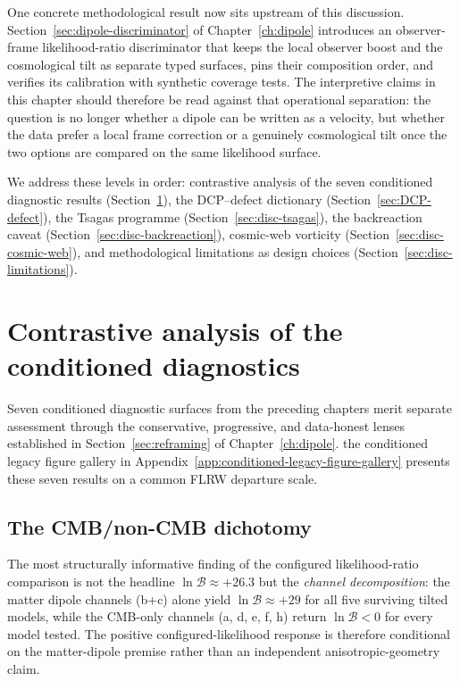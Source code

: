 One concrete methodological result now sits upstream of this
discussion.  Section~\ref{sec:dipole-discriminator} of
Chapter~\ref{ch:dipole} introduces an observer-frame
likelihood-ratio discriminator that keeps the local observer
boost and the cosmological tilt as separate typed surfaces, pins
their composition order, and verifies its calibration with
synthetic coverage tests.  The interpretive claims in this
chapter should therefore be read against that operational
separation: the question is no longer whether a dipole can be
written as a velocity, but whether the data prefer a local frame
correction or a genuinely cosmological tilt once the two options
are compared on the same likelihood surface.

We address these levels in order: contrastive analysis of the
seven conditioned diagnostic results
(Section~\ref{sec:contrastive}), the DCP--defect dictionary
(Section~\ref{sec:DCP-defect}), the Tsagas programme
(Section~\ref{sec:disc-tsagas}), the backreaction caveat
(Section~\ref{sec:disc-backreaction}), cosmic-web vorticity
(Section~\ref{sec:disc-cosmic-web}), and methodological
limitations as design choices
(Section~\ref{sec:disc-limitations}).


\section{Contrastive analysis of the conditioned diagnostics}
\label{sec:contrastive}

Seven conditioned diagnostic surfaces from the preceding chapters merit separate
assessment through the conservative, progressive, and
data-honest lenses established in
Section~\ref{sec:reframing} of Chapter~\ref{ch:dipole}.
the conditioned legacy figure gallery in Appendix~\ref{app:conditioned-legacy-figure-gallery} presents these seven
results on a common FLRW departure scale.


\subsection{The CMB/non-CMB dichotomy}

The most structurally informative finding of the configured likelihood-ratio
comparison is not the headline $\ln\mathcal{B} \approx +26.3$
but the \emph{channel decomposition}: the matter dipole
channels (b+c) alone yield $\ln\mathcal{B} \approx +29$ for
all five surviving tilted models, while the CMB-only channels
(a, d, e, f, h) return $\ln\mathcal{B} < 0$ for every model
tested.  The positive configured-likelihood response is therefore conditional on the
matter-dipole premise rather than an independent anisotropic-geometry
claim.

